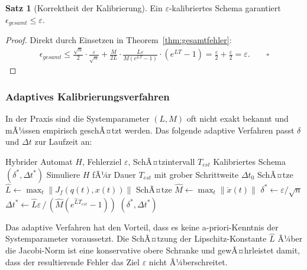 ﻿\documentclass[a4paper,12pt]{article}
\theoremstyle{definition}
\newtheorem{satz}{Satz}[section]
\begin{document}
\begin{satz}[Korrektheit der Kalibrierung]
Ein $\varepsilon$-kalibriertes Schema garantiert $\epsilon_{\mathit{gesamt}} \leq \varepsilon$.
\end{satz}

\begin{proof}
Direkt durch Einsetzen in Theorem~\ref{thm:gesamtfehler}:
\begin{align}
  \epsilon_{\mathit{gesamt}} \leq \frac{\sqrt{n}}{2} \cdot \frac{\varepsilon}{\sqrt{n}} + \frac{M}{2L} \cdot \frac{L\varepsilon}{M(e^{LT}-1)} \cdot (e^{LT}-1) = \frac{\varepsilon}{2} + \frac{\varepsilon}{2} = \varepsilon. \qquad \square
\end{align}
\end{proof}

\subsubsection{Adaptives Kalibrierungsverfahren}

In der Praxis sind die Systemparameter $(L, M)$ oft nicht exakt bekannt und mÃ¼ssen empirisch geschÃ¤tzt werden. Das folgende adaptive Verfahren passt $\delta$ und $\Delta t$ zur Laufzeit an:

\begin{algorithm}[H]
  \caption{Adaptives Kalibrierungsverfahren}
  \begin{algorithmic}[1]
    \Eingabe Hybrider Automat $H$, Fehlerziel $\varepsilon$, SchÃ¤tzintervall $T_{\mathit{est}}$
    \Ausgabe Kalibriertes Schema $(\delta^*, \Delta t^*)$
      \State Simuliere $H$ fÃ¼r Dauer $T_{\mathit{est}}$ mit grober Schrittweite $\Delta t_0$
      \State SchÃ¤tze $\hat{L} \gets \max_{t} \|J_f(q(t), x(t))\|$ 
      \State SchÃ¤tze $\hat{M} \gets \max_{t} \|\ddot{x}(t)\|$ 
      \State $\delta^* \gets \varepsilon / \sqrt{n}$
      \State $\Delta t^* \gets \hat{L}\varepsilon \,/\, (\hat{M}(e^{\hat{L}T_{\mathit{est}}}-1))$
      \State \Return $(\delta^*, \Delta t^*)$
    \EndProzedur
  \end{algorithmic}
\end{algorithm}

Das adaptive Verfahren hat den Vorteil, dass es keine a-priori-Kenntnis der Systemparameter voraussetzt. Die SchÃ¤tzung der Lipschitz-Konstante $\hat{L}$ Ã¼ber die Jacobi-Norm ist eine konservative obere Schranke und gewÃ¤hrleistet damit, dass der resultierende Fehler das Ziel $\varepsilon$ nicht Ã¼berschreitet.
\end{document}
